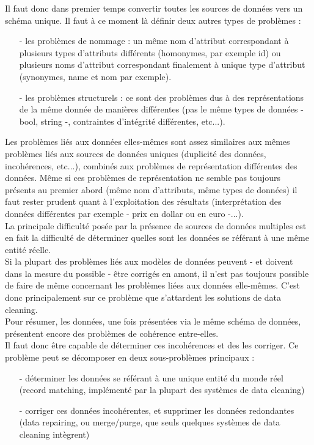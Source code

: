 Il faut donc dans premier temps convertir toutes les sources de données vers un schéma unique. Il faut à ce moment là définir deux autres types de problèmes : 
\begin{itemize}
\item[-]les problèmes de nommage : un même nom d’attribut correspondant à plusieurs types d’attributs différents (homonymes, par exemple id) ou plusieurs noms d’attribut correspondant finalement à unique type d’attribut (synonymes, name et nom par exemple).
\item[-]les problèmes structurels : ce sont des problèmes dus à des représentations de la même donnée de manières différentes (pas le même types de données - bool, string -, contraintes d’intégrité différentes, etc...).
\end{itemize}
Les problèmes liés aux données elles-mêmes sont assez similaires aux mêmes problèmes liés aux sources de données uniques (duplicité des données, incohérences, etc...), combinés aux problèmes de représentation différentes des données. Même si ces problèmes de représentation ne semble pas toujours présents au premier abord (même nom d’attributs, même types de données) il faut rester prudent quant à l’exploitation des résultats (interprétation des données différentes par exemple - prix en dollar ou en euro -...).\\
La principale difficulté posée par la présence de sources de données multiples est en fait la difficulté de déterminer quelles sont les données se référant à une même entité réelle.\\
Si la plupart des problèmes liés aux modèles de données peuvent - et doivent dans la mesure du possible - être corrigés en amont, il n’est pas toujours possible de faire de même concernant les problèmes liées aux données elle-mêmes. C’est donc principalement sur ce problème que s’attardent les solutions de data cleaning.\\
Pour résumer, les données, une fois présentées via le même schéma de données, présentent encore des problèmes de cohérence entre-elles.\\
Il faut donc être capable de déterminer ces incohérences et des les corriger. Ce problème peut se décomposer en deux sous-problèmes principaux :
\begin{itemize}
\item[-]déterminer les données se référant à une unique entité du monde réel (record matching, implémenté par la plupart des systèmes de data cleaning)
\item[-]corriger ces données incohérentes, et supprimer les données redondantes (data repairing, ou merge/purge, que seuls quelques systèmes de data cleaning intègrent)
\end{itemize}
